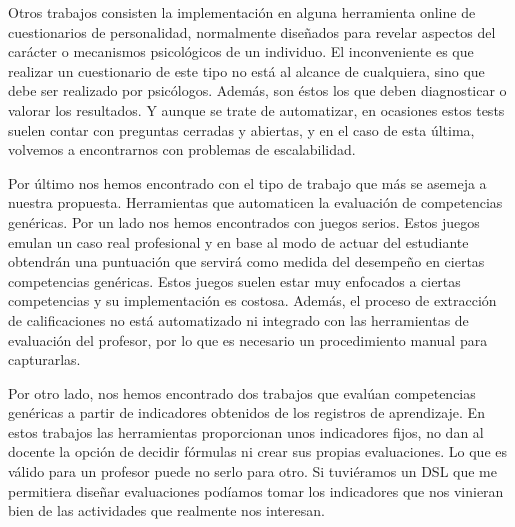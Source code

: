 Otros trabajos consisten la implementación en alguna herramienta online de cuestionarios de personalidad, normalmente diseñados para revelar aspectos del carácter o mecanismos psicológicos de un individuo. El inconveniente es que realizar un cuestionario de este tipo no está al alcance de cualquiera, sino que debe ser realizado por psicólogos. Además, son éstos los que deben diagnosticar o valorar los resultados. Y aunque se trate de automatizar, en ocasiones estos tests suelen contar con preguntas cerradas y abiertas, y en el caso de esta última, volvemos a encontrarnos con problemas de escalabilidad.

Por último nos hemos encontrado con el tipo de trabajo que más se asemeja a nuestra propuesta. Herramientas que automaticen la evaluación de competencias genéricas. Por un lado nos hemos encontrados con juegos serios. Estos juegos emulan un caso real profesional y en base al modo de actuar del estudiante obtendrán una puntuación que servirá como medida del desempeño en ciertas competencias genéricas. Estos juegos suelen estar muy enfocados a ciertas competencias y su implementación es costosa. Además, el proceso de extracción de calificaciones no está automatizado ni integrado con las herramientas de evaluación del profesor, por lo que es necesario un procedimiento manual para capturarlas.

Por otro lado, nos hemos encontrado dos trabajos que evalúan competencias genéricas a partir de indicadores obtenidos de los registros de aprendizaje. En estos trabajos las herramientas proporcionan unos indicadores fijos, no dan al docente la opción de decidir fórmulas ni crear sus propias evaluaciones. Lo que es válido para un profesor puede no serlo para otro. Si tuviéramos un DSL que me permitiera diseñar evaluaciones podíamos tomar los indicadores que nos vinieran bien de las actividades que realmente nos interesan.

\pagestyle{fancy}



